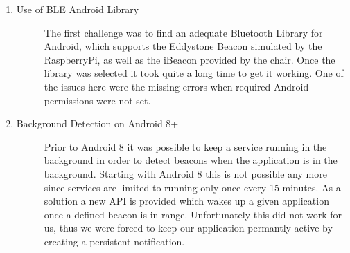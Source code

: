 \documentclass[
10pt, %
a4paper, %
oneside, %
headinclude,footinclude, %
BCOR5mm, %
]{scrartcl}
\begin{document}
\begin{enumerate}
\item 
	\begin{description}
	\item[Use of BLE Android Library] The first challenge was to find an adequate Bluetooth Library for Android, which supports the Eddystone Beacon simulated by the RaspberryPi, as well as the iBeacon provided by the chair. Once the library was selected it took quite a long time to get it working. One of the issues here were the missing errors when required Android permissions were not set. 
	\end{description}
	\item 
	\begin{description}
	\item[Background Detection on Android 8+] Prior to Android 8 it was possible to keep a service running in the background in order to detect beacons when the application is in the background. Starting with Android 8 this is not possible any more \cite{young_2017} since services are limited to running only once every 15 minutes. As a solution a new API is provided which wakes up a given application once a defined beacon is in range. Unfortunately this did not work for us, thus we were forced to keep our application permantly active by creating a persistent notification.
	\end{description}
\end{enumerate}
\end{document}
